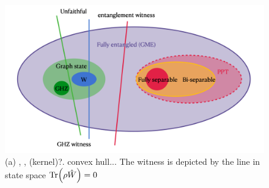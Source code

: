 \documentclass[
aps,
pra,
floatfix,
]{revtex4-2}
\theoremstyle{plain}
\theoremstyle{definition}
\newtheorem{example}{Example}
\newcommand{\ew}{\hat{W}}
\newcommand{\ghz}{\text{GHZ}}
\newcommand{\dm}{\rho}
\begin{document}


\begin{figure}[!ht]
	\centering
		\centering
		\includegraphics[width=.5\linewidth]{witness.png}
	\caption{(a) , ,  (kernel)?. convex hull... The witness is depicted by the line in state space $\Tr(\dm\ew)=0$}
	\label{fig:entangle}
\end{figure}

\end{document}
